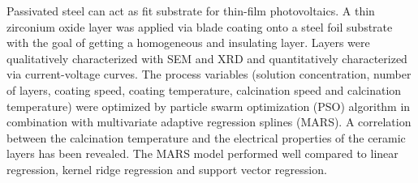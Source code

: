 Passivated steel can act as fit substrate for thin-film photovoltaics.
A thin zirconium oxide layer was applied via blade coating onto a steel foil substrate with the goal of getting a homogeneous and insulating layer.
Layers were qualitatively characterized with SEM and XRD and quantitatively characterized via current-voltage curves.
The process variables (solution concentration, number of layers, coating speed, coating temperature, calcination speed and calcination temperature) were optimized by particle swarm optimization (PSO) algorithm in combination with multivariate adaptive regression splines (MARS).
A correlation between the calcination temperature and the electrical properties of the ceramic layers has been revealed. 
The MARS model performed well compared to 
linear regression, kernel ridge regression and support vector regression.
